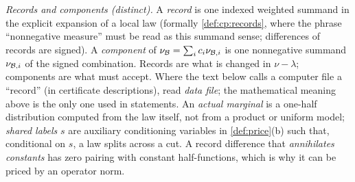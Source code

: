 \emph{Records and components (distinct).}
A \emph{record} is one indexed weighted summand in the explicit
expansion of a local law (formally \cref{def:cp:records}, where the
phrase ``nonnegative measure'' must be read as this summand sense;
differences of records are signed). A \emph{component} of
$\nu_{\mathcal B}=\sum_ic_i\nu_{\mathcal B,i}$ is one nonnegative summand
$\nu_{\mathcal B,i}$ of the signed combination. Records are what is changed
in $\nu-\lambda$; components are what must accept. Where the text
below calls a computer file a ``record'' (in certificate
descriptions), read \emph{data file}; the mathematical meaning
above is the only one used in statements. An \emph{actual
marginal} is a one-half distribution computed from the law itself,
not from a product or uniform model; \emph{shared labels} $s$ are
auxiliary conditioning variables in \cref{def:price}(b) such that,
conditional on $s$, a law splits across a cut. A record difference
that \emph{annihilates constants} has zero pairing with constant
half-functions, which is why it can be priced by an operator norm.

